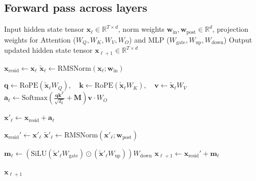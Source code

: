 \documentclass[a4paper,12pt]{article}
\begin{document}
    \subsection{Forward pass across layers}
    \label{alg:transformer_decoder_layer}

    \begin{algorithm}[H]
    \caption{Forward Pass of a Pre-LN Transformer Decoder Layer $\ell$}
    \begin{algorithmic}[1]
    \REQUIRE Input hidden state tensor $\mathbf{x}_\ell \in \mathbb{R}^{T \times d}$, norm weights $\mathbf{w}_{\text{in}}, \mathbf{w}_{\text{post}} \in \mathbb{R}^d$, projection weights for Attention ($W_Q, W_K, W_V, W_O$) and MLP ($W_{\text{gate}}, W_{\text{up}}, W_{\text{down}}$)
    \ENSURE Output updated hidden state tensor $\mathbf{x}_{\ell+1} \in \mathbb{R}^{T \times d}$

    \STATE $\mathbf{x}_{\text{resid}} \leftarrow \mathbf{x}_\ell$ 
    \STATE $\tilde{\mathbf{x}}_\ell \leftarrow \text{RMSNorm}(\mathbf{x}_\ell; \mathbf{w}_{\text{in}})$ 

    \STATE $\mathbf{q} \leftarrow \text{RoPE}(\tilde{\mathbf{x}}_\ell W_Q), \quad \mathbf{k} \leftarrow \text{RoPE}(\tilde{\mathbf{x}}_\ell W_K), \quad \mathbf{v} \leftarrow \tilde{\mathbf{x}}_\ell W_V$ 
    \STATE $\mathbf{a}_\ell \leftarrow \text{Softmax}\left(\frac{\mathbf{q}\mathbf{k}^T}{\sqrt{d_k}} + \mathbf{M}\right)\mathbf{v} \cdot W_O$ 

    \STATE $\mathbf{x}'_\ell \leftarrow \mathbf{x}_{\text{resid}} + \mathbf{a}_\ell$ 

    \STATE $\mathbf{x}_{\text{resid}}' \leftarrow \mathbf{x}'_\ell$ 
    \STATE $\tilde{\mathbf{x}}'_\ell \leftarrow \text{RMSNorm}(\mathbf{x}'_\ell; \mathbf{w}_{\text{post}})$ 

    \STATE $\mathbf{m}_\ell \leftarrow \left(\text{SiLU}(\tilde{\mathbf{x}}'_\ell W_{\text{gate}}) \odot (\tilde{\mathbf{x}}'_\ell W_{\text{up}})\right) W_{\text{down}}$ 
    \STATE $\mathbf{x}_{\ell+1} \leftarrow \mathbf{x}_{\text{resid}}' + \mathbf{m}_\ell$ 

    \RETURN $\mathbf{x}_{\ell+1}$
    \end{algorithmic}
    \end{algorithm}
\end{document}
